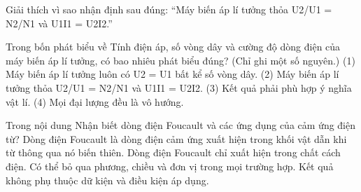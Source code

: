 \begin{bt}
Giải thích vì sao nhận định sau đúng: “Máy biến áp lí tưởng thỏa U2/U1 = N2/N1 và U1I1 = U2I2.”
\end{bt}

\begin{ex}
Trong bốn phát biểu về Tính điện áp, số vòng dây và cường độ dòng điện của máy biến áp lí tưởng, có bao nhiêu phát biểu đúng? (Chỉ ghi một số nguyên.) (1) Máy biến áp lí tưởng luôn có U2 = U1 bất kể số vòng dây. (2) Máy biến áp lí tưởng thỏa U2/U1 = N2/N1 và U1I1 = U2I2. (3) Kết quả phải phù hợp ý nghĩa vật lí. (4) Mọi đại lượng đều là vô hướng.
\end{ex}

\begin{ex}
Trong nội dung Nhận biết dòng điện Foucault và các ứng dụng của cảm ứng điện từ?
\choice
{\True Dòng điện Foucault là dòng điện cảm ứng xuất hiện trong khối vật dẫn khi từ thông qua nó biến thiên.}
{Dòng điện Foucault chỉ xuất hiện trong chất cách điện.}
{Có thể bỏ qua phương, chiều và đơn vị trong mọi trường hợp.}
{Kết quả không phụ thuộc dữ kiện và điều kiện áp dụng.}
\end{ex}

